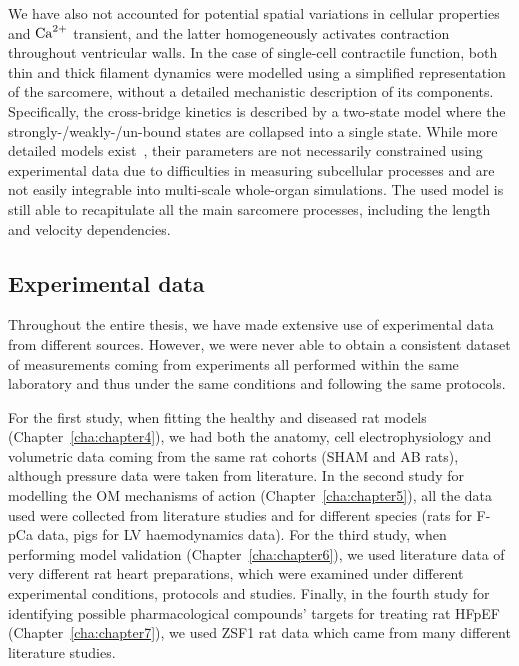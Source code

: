 \vspace{0.2cm}
We have also not accounted for potential spatial variations in cellular properties and $\textrm{Ca}^{2+}$ transient, and the latter homogeneously activates contraction throughout ventricular walls. In the case of single-cell contractile function, both thin and thick filament dynamics were modelled using a simplified representation of the sarcomere, without a detailed mechanistic description of its components. Specifically, the cross-bridge kinetics is described by a two-state model where the strongly-/weakly-/un-bound states are collapsed into a single state. While more detailed models exist~\cite{Land:2015}, their parameters are not necessarily constrained using experimental data due to difficulties in measuring subcellular processes and are not easily integrable into multi-scale whole-organ simulations. The used model is still able to recapitulate all the main sarcomere processes, including the length and velocity dependencies.


%
%
%
\subsection{Experimental data}\label{sec:ch9experimental_data}
Throughout the entire thesis, we have made extensive use of experimental data from different sources. However, we were never able to obtain a consistent dataset of measurements coming from experiments all performed within the same laboratory and thus under the same conditions and following the same protocols.

\vspace{0.2cm}
For the first study, when fitting the healthy and diseased rat models (Chapter~\ref{cha:chapter4}), we had both the anatomy, cell electrophysiology and volumetric data coming from the same rat cohorts (SHAM and AB rats), although pressure data were taken from literature. In the second study for modelling the OM mechanisms of action (Chapter~\ref{cha:chapter5}), all the data used were collected from literature studies and for different species (rats for F-pCa data, pigs for LV haemodynamics data). For the third study, when performing model validation (Chapter~\ref{cha:chapter6}), we used literature data of very different rat heart preparations, which were examined under different experimental conditions, protocols and studies. Finally, in the fourth study for identifying possible pharmacological compounds' targets for treating rat HFpEF (Chapter~\ref{cha:chapter7}), we used ZSF1 rat data which came from many different literature studies.

